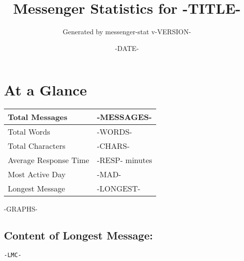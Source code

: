 \documentclass[11pt]{article}
\title{Messenger Statistics for -TITLE-}
\author{Generated by messenger-stat v-VERSION-}
\date{-DATE-}
\begin{document}
\maketitle

\section*{At a Glance}
\begin{center}
    \begin{tabularx}{\textwidth}{ | X | p{6cm} | }
    \hline
        Total Messages & -MESSAGES- \\ \hline
        Total Words & -WORDS- \\ \hline
        Total Characters & -CHARS- \\ \hline
        Average Response Time & -RESP- minutes \\ \hline
        Most Active Day & -MAD- \\ \hline
        Longest Message & -LONGEST- \\
    \hline
    \end{tabularx}
\end{center}

\clearpage
-GRAPHS-

\subsection*{Content of Longest Message:}
\begin{lstlisting}
-LMC-
\end{lstlisting}
\end{document}
